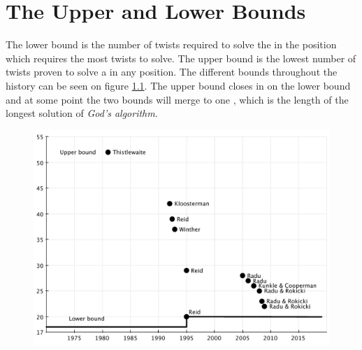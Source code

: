 \chapter{The Upper and Lower Bounds}
\label{chap:bounds}
The lower bound is the number of twists required to solve the \rubik{} in the position which requires the most twists to solve.
The upper bound is the lowest number of twists proven to solve a \rubik{} in any position.
The different bounds throughout the history can be seen on figure \ref{fig:upperLowerBound}.
The upper bound closes in on the lower bound and at some point the two bounds will merge to one \cite{rokicki09}, which is the length of the longest solution of \textit{God's algorithm}.

\begin{figure}[ht]
	\centering
		\includegraphics[scale = 0.5]{input/pics/bounds2.pdf}
	\caption{}
	\label{fig:upperLowerBound}
\end{figure}


\label{sec:bounds}


